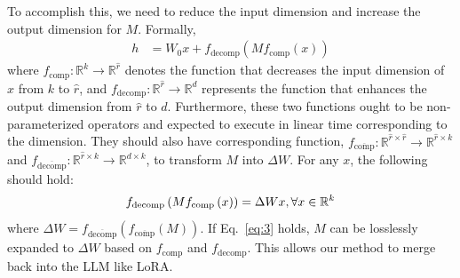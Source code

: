 \documentclass[11pt]{article}
\begin{document}
To accomplish this, we need to reduce the input dimension and increase the output dimension for $M$. Formally,
\begin{equation}
\label{eq:hle-bert}
\begin{split}
  h &= W_0x + f_{\text{decomp}}\left(M  f_{\text{comp}}\left(x\right)\right)
\end{split}
\end{equation}
where $f_{\text{comp}}: \mathbb{R}^k \rightarrow \mathbb{R}^{\hat{r}}$ denotes the function that decreases the input dimension of $x$ from $k$ to $\hat{r}$, and $f_{\text{decomp}}: \mathbb{R}^{\hat{r}} \rightarrow \mathbb{R}^{d}$ represents the function that enhances the output dimension from $\hat{r}$ to $d$.
Furthermore, these two functions ought to be non-parameterized operators and expected to execute in linear time corresponding to the dimension. %
They should also have corresponding function, $f_{\overline{\text{comp}}}: \mathbb{R}^{\hat{r}\times \hat{r}} \rightarrow \mathbb{R}^{\hat{r}\times k}$ and $f_{\overline{\text{decomp}}}: \mathbb{R}^{\hat{r}\times k} \rightarrow \mathbb{R}^{d \times k}$, to transform $M$ into $\Delta W$. For any $x$, the following should hold:
\begin{equation}
  \label{eq:3}
f_{\text{decomp}}\left(Mf_{\text{comp}}\left(x\right)\right) =  \Delta W x , \forall x \in \mathbb{R}^k \\
\end{equation}
where $ \Delta W = f_{\overline{\text{decomp}}}\left(f_{\overline{\text{comp}}}\left(M\right)\right)$.
If Eq.~\ref{eq:3} holds, $M$ can be losslessly expanded to $\Delta W$ based on $f_{\text{comp}}$ and $f_{\text{decomp}}$. This allows our method to merge back into the LLM like LoRA.


\end{document}
